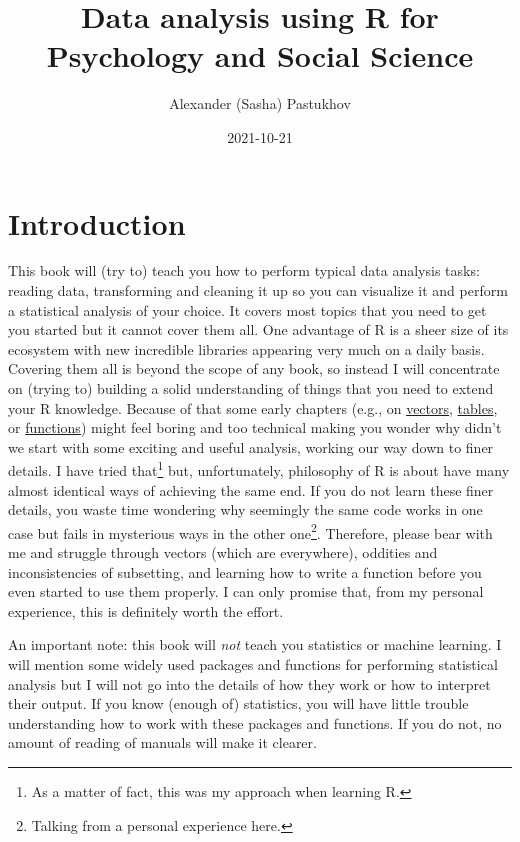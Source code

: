 \documentclass[
]{book}
\title{Data analysis using R for Psychology and Social Science}
\author{Alexander (Sasha) Pastukhov}
\date{2021-10-21}
\begin{document}
\maketitle

{
\setcounter{tocdepth}{1}
\tableofcontents
}
\hypertarget{introduction}{%
\chapter*{Introduction}\label{introduction}}

This book will (try to) teach you how to perform typical data analysis tasks: reading data, transforming and cleaning it up so you can visualize it and perform a statistical analysis of your choice. It covers most topics that you need to get you started but it cannot cover them all. One advantage of R is a sheer size of its ecosystem with new incredible libraries appearing very much on a daily basis. Covering them all is beyond the scope of any book, so instead I will concentrate on (trying to) building a solid understanding of things that you need to extend your R knowledge. Because of that some early chapters (e.g., on \protect\hyperlink{vectors}{vectors}, \protect\hyperlink{tables}{tables}, or \protect\hyperlink{ux5cux23functions}{functions}) might feel boring and too technical making you wonder why didn't we start with some exciting and useful analysis, working our way down to finer details. I have tried that\footnote{As a matter of fact, this was my approach when learning R.} but, unfortunately, philosophy of R is about have many almost identical ways of achieving the same end. If you do not learn these finer details, you waste time wondering why seemingly the same code works in one case but fails in mysterious ways in the other one\footnote{Talking from a personal experience here.}. Therefore, please bear with me and struggle through vectors (which are everywhere), oddities and inconsistencies of subsetting, and learning how to write a function before you even started to use them properly. I can only promise that, from my personal experience, this is definitely worth the effort.

An important note: this book will \emph{not} teach you statistics or machine learning. I will mention some widely used packages and functions for performing statistical analysis but I will not go into the details of how they work or how to interpret their output. If you know (enough of) statistics, you will have little trouble understanding how to work with these packages and functions. If you do not, no amount of reading of manuals will make it clearer.
\end{document}

